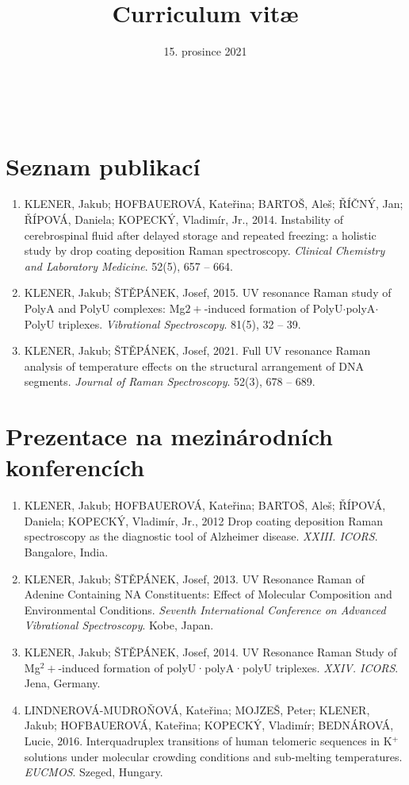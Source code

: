\documentclass[12pt,sans]{moderncv}
\title{Curriculum vit\ae{}}
\date{15. prosince 2021}
\begin{document}
\recipient{~}{}
\opening{~}

\makelettertitle


\section{Seznam publikací}

\noindent

\begin{enumerate}
\setlength\itemsep{3mm}

\item
KLENER, Jakub; HOFBAUEROVÁ, Kateřina; BARTOŠ, Aleš; ŘÍČNÝ, Jan; ŘÍPOVÁ,
Daniela; KOPECKÝ, Vladimír, Jr.,
2014.
Instability of cerebrospinal fluid after delayed storage and repeated freezing:
a holistic study by drop coating deposition Raman spectroscopy.
\emph{Clinical Chemistry and Laboratory Medicine}.
52(5), 657 -- 664.

\item
KLENER, Jakub; ŠTĚPÁNEK, Josef,
2015.
UV resonance Raman study of PolyA and PolyU complexes: Mg$2+$-induced formation
of PolyU$\cdot$polyA$\cdot$PolyU triplexes.
\emph{Vibrational Spectroscopy}.
81(5), 32 -- 39.

\item
KLENER, Jakub; ŠTĚPÁNEK, Josef,
2021.
Full UV resonance Raman analysis of temperature effects on the structural
arrangement of DNA segments.
\emph{Journal of Raman Spectroscopy}.
52(3), 678 -- 689.
\end{enumerate}


\section{Prezentace na mezinárodních konferencích}

\begin{enumerate}
\setlength\itemsep{3mm}

\item
KLENER, Jakub; HOFBAUEROVÁ, Kateřina; BARTOŠ, Aleš; ŘÍPOVÁ, Daniela;
KOPECKÝ, Vladimír, Jr.,
2012
Drop coating deposition Raman spectroscopy as the diagnostic tool of Alzheimer
disease.
\emph{XXIII. ICORS}. Bangalore, India.

\item
KLENER, Jakub; ŠTĚPÁNEK, Josef,
2013.
UV Resonance Raman of Adenine Containing NA Constituents: Effect of Molecular
Composition and Environmental Conditions.
\emph{Seventh International Conference on Advanced Vibrational Spectroscopy}.
Kobe, Japan.

\item
KLENER, Jakub; ŠTĚPÁNEK, Josef,
2014.
UV Resonance Raman Study of Mg$^2+$-induced formation of polyU·polyA·polyU
triplexes.
\emph{XXIV. ICORS}.
Jena, Germany.

\item
LINDNEROVÁ-MUDROŇOVÁ, Kateřina; MOJZEŠ, Peter; KLENER, Jakub; HOFBAUEROVÁ,
Kateřina; KOPECKÝ, Vladimír; BEDNÁROVÁ, Lucie,
2016.
Interquadruplex transitions of human telomeric sequences in K$^+$ solutions
under molecular crowding conditions and sub-melting temperatures.
\emph{EUCMOS}.
Szeged, Hungary.

\end{enumerate}
\end{document}
